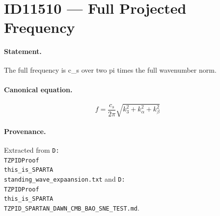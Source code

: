 \section*{ID11510 --- Full Projected Frequency}

\paragraph{Statement.}
The full frequency is c_s over two pi times the full wavenumber norm.

\paragraph{Canonical equation.}
\[
f=\frac{c_s}{2\pi}\sqrt{k_3^2+k_\alpha^2+k_\beta^2}
\]

\paragraph{Provenance.}
Extracted from \texttt{D:\\TZPIDProof\\this\_is\_SPARTA\\standing\_wave\_expaansion.txt} and \texttt{D:\\TZPIDProof\\this\_is\_SPARTA\\TZPID\_SPARTAN\_DAWN\_CMB\_BAO\_SNE\_TEST.md}.
